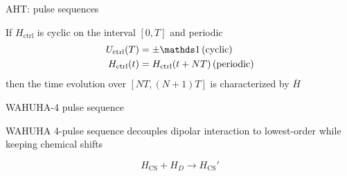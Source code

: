\documentclass{beamer}
\begin{document}
\begin{frame}{AHT: pulse sequences}

If $H_{\text{ctrl}}$ is cyclic on the interval $[0,T]$ and periodic \cite{gerstein-dybowski}
\begin{align*}
    U_{\text{ctrl}}(T) &= \pm \identity \, \text{(cyclic)} \\
    H_{\text{ctrl}}(t) &= H_{\text{ctrl}}(t + NT) \, \text{(periodic)}
\end{align*}
then the time evolution over $[NT, (N+1)T]$ is characterized by $\overline{H}$

\begin{figure}[H]
    \centering
    
\end{figure}

\end{frame}



\begin{frame}{WAHUHA-4 pulse sequence}

WAHUHA 4-pulse sequence decouples dipolar interaction to lowest-order while keeping chemical shifts \cite{PhysRevLett.20.180}

\[
H_{\text{CS}} + H_D \longrightarrow H_{\text{CS}}'
\]

\begin{figure}
\centering
\scalebox{.7}{

}
\end{figure}


\end{frame}
\end{document}
